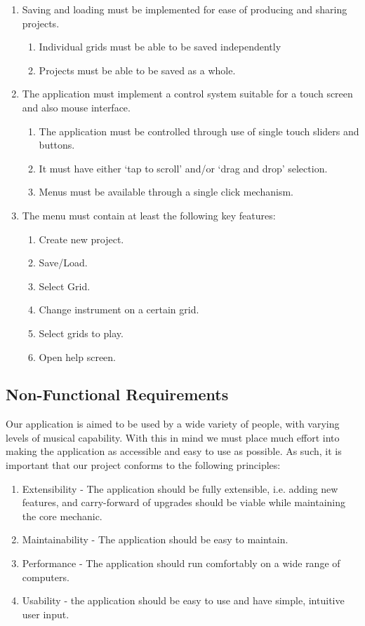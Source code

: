 \documentclass[10pt,a4paper]{article}
\begin{document}
\begin{enumerate}
\item Saving and loading must be implemented for ease of producing and sharing projects.
\begin{enumerate}
\item Individual grids must be able to be saved independently
\item Projects must be able to be saved as a whole.
\end{enumerate}

\item The application must implement a control system suitable for a touch screen and also mouse interface.
\begin{enumerate}
\item The application must be controlled through use of single touch sliders and buttons.
\item It must have either `tap to scroll' and/or `drag and drop' selection.
\item Menus must be available through a single click mechanism.
\end{enumerate}

\item The menu must contain at least the following key features:
\begin{enumerate}
\item Create new project.
\item Save/Load.
\item Select Grid.
\item Change instrument on a certain grid.
\item Select grids to play.
\item Open help screen.
\end{enumerate}

\end{enumerate}
\subsection{Non-Functional Requirements}
Our application is aimed to be used by a wide variety of people, with varying levels of musical capability. With this in mind we must place much effort into making the application as accessible and easy to use as possible. As such, it is important that our project conforms to the following principles:

\begin{enumerate}
\item Extensibility - The application should be fully extensible, i.e. adding new features, and carry-forward of upgrades should be viable while maintaining the core mechanic.
\item Maintainability - The application should be easy to maintain.
\item Performance - The application should run comfortably on a wide range of computers.
\item Usability - the application should be easy to use and have simple, intuitive user input.
\end{enumerate}
\end{document}
